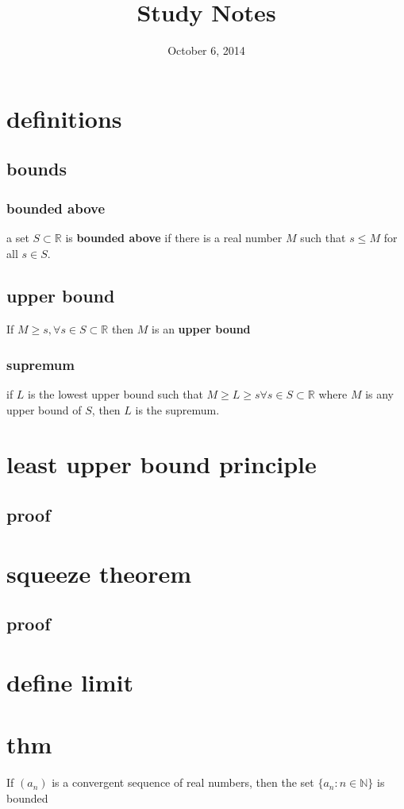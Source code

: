 \documentclass[letterpaper]{article}
\begin{document}
\title{Study Notes}
\date{October 6, 2014}
\maketitle
\section*{definitions}
\subsection*{bounds}
\subsubsection*{bounded above}
a set $S\subset \mathbb{R}$ is {\bfseries bounded above} if there is a real number $M$ such that $s\le M$ for all $s\in S$.
\subsection*{upper bound}
If $M\ge s, \forall s\in S\subset\mathbb{R}$ then $M$ is an {\bfseries upper bound}
\subsubsection*{supremum}
if $L$ is the lowest upper bound such that $M\ge L\ge s\forall s\in S\subset\mathbb{R}$ where $M$ is any upper bound of $S$, then $L$ is the supremum.

\section*{least upper bound principle}
\subsection*{proof}
\section*{squeeze theorem}
\subsection*{proof}
\section*{define limit}
\section*{thm}
If $(a_n)$ is a convergent sequence of real numbers, then the set $\{a_n:n\in \mathbb{N}\}$ is bounded
\end{document}
